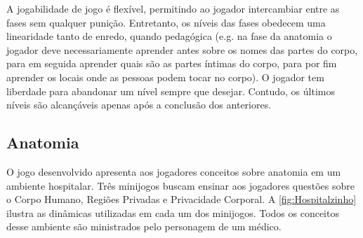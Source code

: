 A jogabilidade de jogo é flexível, permitindo ao jogador intercambiar entre as fases sem qualquer punição. Entretanto, os níveis das fases obedecem uma linearidade tanto de enredo, quando pedagógica (e.g. na fase da anatomia o jogador deve necessariamente aprender antes sobre os nomes das partes do corpo, para em seguida aprender quais são as partes íntimas do corpo, para por fim aprender os locais onde as pessoas podem tocar no corpo). O jogador tem liberdade para abandonar um nível sempre que desejar. Contudo, os últimos níveis são alcançáveis apenas após a conclusão dos anteriores. 

\newpage

\subsection{Anatomia}\label{subsec:1}

O jogo desenvolvido apresenta aos jogadores conceitos sobre anatomia em um ambiente hospitalar. Três minijogos buscam ensinar aos jogadores questões sobre o Corpo Humano, Regiões Privadas e Privacidade Corporal. A \autoref{fig:Hospitalzinho} ilustra as dinâmicas utilizadas em cada um dos minijogos. Todos os conceitos desse ambiente são ministrados pelo personagem de um médico. 


